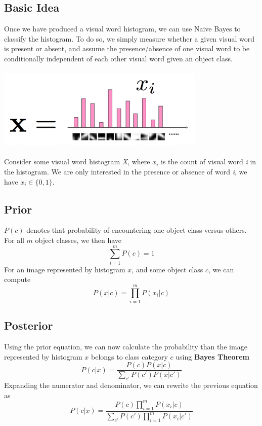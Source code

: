 \documentclass{article}
\begin{document}
\subsection{Basic Idea}
Once we have produced a visual word histogram, we can use Naive Bayes to classify the histogram. To do so, we simply measure whether a given visual word is present or absent, and assume the presence/absence of one visual word to be conditionally independent of each other visual word given an object class. 
\begin{center}
\includegraphics[width=10cm,height=4cm]{Bayes_Histogram}
\end{center}

Consider some visual word histogram \textit{X}, where $x_i$ is the count of visual word \textit{i} in the histogram. We are only interested in the presence or absence of word \textit{i}, we have $x_i \in \{0,1\}$.  
\subsection{Prior}
$P(c)$ denotes that probability of encountering one object class versus others. For all $m$ object classes, we then have $$\sum_{i=1}^m P(c)=1$$ For an image represented by histogram $x$, and some object class $c$, we can compute $$P(x|c) = \prod_{i=1}^m P(x_i|c)$$
\subsection{Posterior}
Using the prior equation, we can now calculate the probability than the image represented by histogram $x$ belongs to class category $c$ using \textbf{Bayes Theorem} $$P(c|x) = \frac{P(c)P(x|c)}{\sum_{c'}P(c')P(x|c')}$$
Expanding the numerator and denominator, we can rewrite the previous equation as 
$$P(c|x) = \frac{P(c)\prod_{i=1}^mP(x_i|c)}{\sum_{c'}P(c')\prod_{i=1}^mP(x_i|c')}$$
\end{document}
